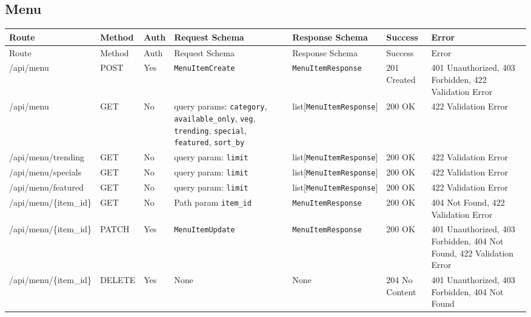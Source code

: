 \subsection{Menu}
\begin{longtable}{p{3.2cm} p{1.7cm} p{2.2cm} p{3.6cm} p{3.6cm} p{1.8cm} p{1.8cm}}
\toprule
Route & Method & Auth & Request Schema & Response Schema & Success & Error \\
\midrule
\endfirsthead
\toprule
Route & Method & Auth & Request Schema & Response Schema & Success & Error \\
\midrule
\endhead
\bottomrule
\endfoot

/api/menu & POST & Yes & \texttt{MenuItemCreate} & \texttt{MenuItemResponse} & 201 Created & 401 Unauthorized, 403 Forbidden, 422 Validation Error \\

/api/menu & GET & No & query params: \texttt{category}, \texttt{available\_only}, \texttt{veg}, \texttt{trending}, \texttt{special}, \texttt{featured}, \texttt{sort\_by} & list[\texttt{MenuItemResponse}] & 200 OK & 422 Validation Error \\

/api/menu/trending & GET & No & query param: \texttt{limit} & list[\texttt{MenuItemResponse}] & 200 OK & 422 Validation Error \\

/api/menu/specials & GET & No & query param: \texttt{limit} & list[\texttt{MenuItemResponse}] & 200 OK & 422 Validation Error \\

/api/menu/featured & GET & No & query param: \texttt{limit} & list[\texttt{MenuItemResponse}] & 200 OK & 422 Validation Error \\

/api/menu/\{item\_id\} & GET & No & Path param \texttt{item\_id} & \texttt{MenuItemResponse} & 200 OK & 404 Not Found, 422 Validation Error \\

/api/menu/\{item\_id\} & PATCH & Yes & \texttt{MenuItemUpdate} & \texttt{MenuItemResponse} & 200 OK & 401 Unauthorized, 403 Forbidden, 404 Not Found, 422 Validation Error \\

/api/menu/\{item\_id\} & DELETE & Yes & None & None & 204 No Content & 401 Unauthorized, 403 Forbidden, 404 Not Found \\
\end{longtable}

